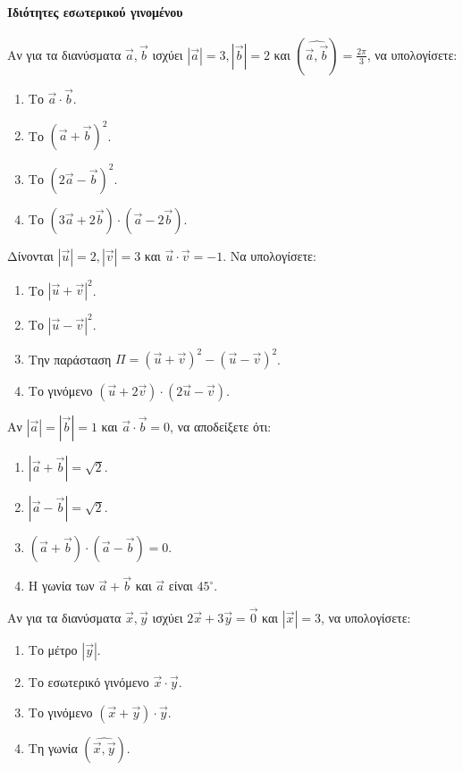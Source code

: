 \documentclass[11pt,a4paper,modern]{FFExercises}
\begin{document}
\paragraph{Ιδιότητες εσωτερικού γινομένου}

\askhsh
Αν για τα διανύσματα $\vec{a}, \vec{b}$ ισχύει $|\vec{a}|=3, |\vec{b}|=2$ και $(\widehat{\vec{a},\vec{b}})=\frac{2\pi}{3}$, να υπολογίσετε:
\begin{enumerate}
    \item Το $\vec{a}\cdot\vec{b}$.
    \item Το $(\vec{a}+\vec{b})^2$.
    \item Το $(2\vec{a}-\vec{b})^2$.
    \item Το $(3\vec{a}+2\vec{b})\cdot(\vec{a}-2\vec{b})$.
\end{enumerate}

\askhsh
Δίνονται $|\vec{u}|=2, |\vec{v}|=3$ και $\vec{u}\cdot\vec{v}=-1$. Να υπολογίσετε:
\begin{enumerate}
    \item Το $|\vec{u}+\vec{v}|^2$.
    \item Το $|\vec{u}-\vec{v}|^2$.
    \item Την παράσταση $\Pi = (\vec{u}+\vec{v})^2 - (\vec{u}-\vec{v})^2$.
    \item Το γινόμενο $(\vec{u}+2\vec{v})\cdot(2\vec{u}-\vec{v})$.
\end{enumerate}

\askhsh
Αν $|\vec{a}|=|\vec{b}|=1$ και $\vec{a}\cdot\vec{b}=0$, να αποδείξετε ότι:
\begin{enumerate}
    \item $|\vec{a}+\vec{b}| = \sqrt{2}$.
    \item $|\vec{a}-\vec{b}| = \sqrt{2}$.
    \item $(\vec{a}+\vec{b})\cdot(\vec{a}-\vec{b}) = 0$.
    \item Η γωνία των $\vec{a}+\vec{b}$ και $\vec{a}$ είναι $45^\circ$.
\end{enumerate}

\askhsh
Αν για τα διανύσματα $\vec{x}, \vec{y}$ ισχύει $2\vec{x}+3\vec{y}=\vec{0}$ και $|\vec{x}|=3$, να υπολογίσετε:
\begin{enumerate}
    \item Το μέτρο $|\vec{y}|$.
    \item Το εσωτερικό γινόμενο $\vec{x}\cdot\vec{y}$.
    \item Το γινόμενο $(\vec{x}+\vec{y})\cdot\vec{y}$.
    \item Τη γωνία $(\widehat{\vec{x},\vec{y}})$.
\end{enumerate}
\end{document}
